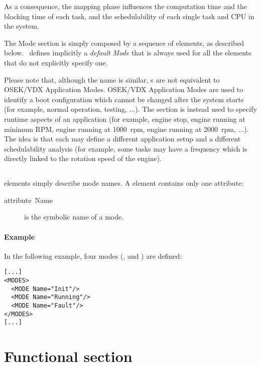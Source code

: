 As a consequence, the mapping phase influences the computation time
and the blocking time of each task, and the schedulability of each
single task and CPU in the system.

The Mode section is simply composed by a sequence of 
elements, as described below. \rtd\ defines implicitly a \emph{default
  Mode} that is always used for all the elements that do not
explicitly specify one.

Please note that, although the name is similar, s are not
equivalent to OSEK/VDX Application Modes. OSEK/VDX Application Modes
are used to identify a boot configuration which cannot be changed
after the system starts (for example, normal operation, testing,
...). The  section is instead used to specify runtime
aspects of an application (for example, engine stop, engine running at
minimum RPM, engine running at 1000~rpm, engine running at 2000~rpm,
...). The idea is that each  may define a different
application setup and a different schedulability analysis (for
example, some tasks may have a frequency which is directly linked to
the rotation speed of the engine).

\subsection{}

 elements simply describe mode names. A 
element contains only one attribute:
\begin{description}
\item [{attribute~Name}] is the symbolic name of a mode.
\end{description}

\paragraph{Example}

In the following example, four modes (,  and ) are defined:

\begin{lstlisting}
[...]
<MODES>
  <MODE Name="Init"/>
  <MODE Name="Running"/>
  <MODE Name="Fault"/>
</MODES>
[...]
\end{lstlisting}


\section{Functional section}
\label{sec:Functional-section}

